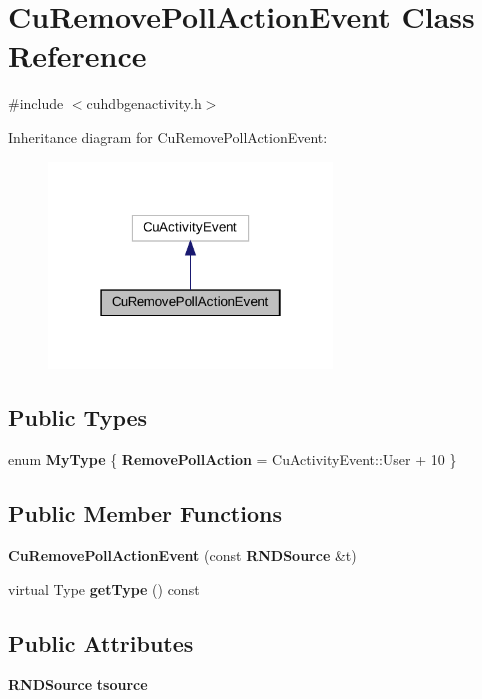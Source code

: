 \section{Cu\+Remove\+Poll\+Action\+Event Class Reference}
\label{classCuRemovePollActionEvent}


{\ttfamily \#include $<$cuhdbgenactivity.\+h$>$}



Inheritance diagram for Cu\+Remove\+Poll\+Action\+Event\+:
\nopagebreak
\begin{figure}[H]
\begin{center}
\leavevmode
\includegraphics[width=214pt]{classCuRemovePollActionEvent__inherit__graph}
\end{center}
\end{figure}
\subsection*{Public Types}
\begin{DoxyCompactItemize}
\item 
enum \textbf{ My\+Type} \{ \textbf{ Remove\+Poll\+Action} = Cu\+Activity\+Event\+::User + 10
 \}
\end{DoxyCompactItemize}
\subsection*{Public Member Functions}
\begin{DoxyCompactItemize}
\item 
\textbf{ Cu\+Remove\+Poll\+Action\+Event} (const \textbf{ R\+N\+D\+Source} \&t)
\item 
virtual Type \textbf{ get\+Type} () const
\end{DoxyCompactItemize}
\subsection*{Public Attributes}
\begin{DoxyCompactItemize}
\item 
\textbf{ R\+N\+D\+Source} \textbf{ tsource}
\end{DoxyCompactItemize}


